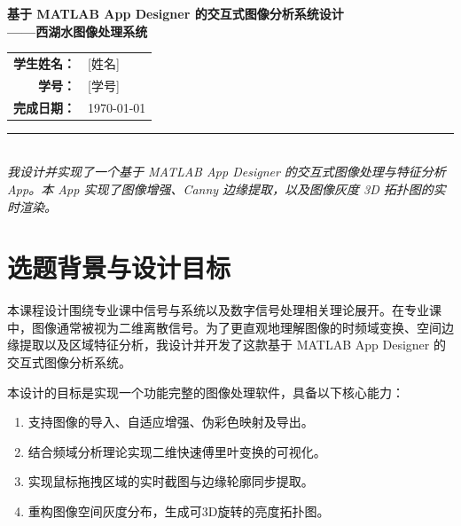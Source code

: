 \documentclass[UTF8, a4paper, 11pt]{ctexart}
\begin{document}
\begin{titlepage}
    \begin{center}
        \vspace*{2cm}
        \Huge{\textbf{基于 MATLAB App Designer 的交互式图像分析系统设计}}\\
        \vspace{0.5cm}
        \Large{\textbf{——西湖水图像处理系统}}\\
        \vspace{2cm}
        
        \large
        \begin{tabular}{rl}
            \textbf{学生姓名：} & [姓名] \\  %
            \textbf{学号：} & [学号] \\      %
            \textbf{完成日期：} & \today \\
        \end{tabular}
        \vspace{3cm}
        
        \rule{0.8\textwidth}{0.5pt} \\
        \vspace{0.5cm}
        \textit{我设计并实现了一个基于 MATLAB App Designer 的交互式图像处理与特征分析 App。本 App 实现了图像增强、Canny 边缘提取，以及图像灰度 3D 拓扑图的实时渲染。}
    \end{center}
\end{titlepage}

\newpage
\newpage

\section{选题背景与设计目标}
本课程设计围绕专业课中信号与系统以及数字信号处理相关理论展开。在专业课中，图像通常被视为二维离散信号。为了更直观地理解图像的时频域变换、空间边缘提取以及区域特征分析，我设计并开发了这款基于 MATLAB App Designer 的交互式图像分析系统。


本设计的目标是实现一个功能完整的图像处理软件，具备以下核心能力：
\begin{enumerate}
    \item 支持图像的导入、自适应增强、伪彩色映射及导出。
    \item 结合频域分析理论实现二维快速傅里叶变换的可视化。
    \item 实现鼠标拖拽区域的实时截图与边缘轮廓同步提取。
    \item 重构图像空间灰度分布，生成可3D旋转的亮度拓扑图。
\end{enumerate}
\end{document}
